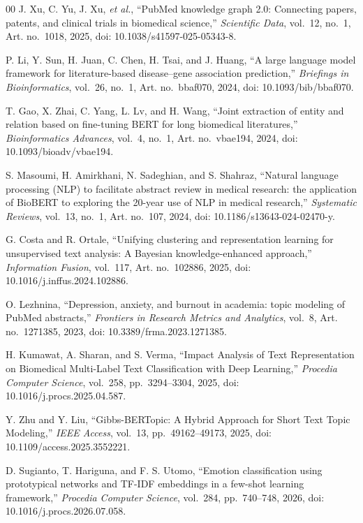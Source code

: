 \documentclass[a4paper,fleqn]{cas-dc}
\begin{document}
\begin{thebibliography}{00}
 J. Xu, C. Yu, J. Xu, \textit{et al.}, ``PubMed knowledge graph 2.0: Connecting papers, patents, and clinical trials in biomedical science,'' \textit{Scientific Data}, vol.~12, no.~1, Art. no.~1018, 2025, doi: 10.1038/s41597-025-05343-8.

 P. Li, Y. Sun, H. Juan, C. Chen, H. Tsai, and J. Huang, ``A large language model framework for literature-based disease–gene association prediction,'' \textit{Briefings in Bioinformatics}, vol.~26, no.~1, Art. no.~bbaf070, 2024, doi: 10.1093/bib/bbaf070.

 T. Gao, X. Zhai, C. Yang, L. Lv, and H. Wang, ``Joint extraction of entity and relation based on fine-tuning BERT for long biomedical literatures,'' \textit{Bioinformatics Advances}, vol.~4, no.~1, Art. no.~vbae194, 2024, doi: 10.1093/bioadv/vbae194.

 S. Masoumi, H. Amirkhani, N. Sadeghian, and S. Shahraz, ``Natural language processing (NLP) to facilitate abstract review in medical research: the application of BioBERT to exploring the 20-year use of NLP in medical research,'' \textit{Systematic Reviews}, vol.~13, no.~1, Art. no.~107, 2024, doi: 10.1186/s13643-024-02470-y.

 G. Costa and R. Ortale, ``Unifying clustering and representation learning for unsupervised text analysis: A Bayesian knowledge-enhanced approach,'' \textit{Information Fusion}, vol.~117, Art. no.~102886, 2025, doi: 10.1016/j.inffus.2024.102886.

 O. Lezhnina, ``Depression, anxiety, and burnout in academia: topic modeling of PubMed abstracts,'' \textit{Frontiers in Research Metrics and Analytics}, vol.~8, Art. no.~1271385, 2023, doi: 10.3389/frma.2023.1271385.

 H. Kumawat, A. Sharan, and S. Verma, ``Impact Analysis of Text Representation on Biomedical Multi-Label Text Classification with Deep Learning,'' \textit{Procedia Computer Science}, vol.~258, pp.~3294--3304, 2025, doi: 10.1016/j.procs.2025.04.587.

 Y. Zhu and Y. Liu, ``Gibbs-BERTopic: A Hybrid Approach for Short Text Topic Modeling,'' \textit{IEEE Access}, vol.~13, pp.~49162--49173, 2025, doi: 10.1109/access.2025.3552221.

 D. Sugianto, T. Hariguna, and F. S. Utomo, ``Emotion classification using prototypical networks and TF-IDF embeddings in a few-shot learning framework,'' \textit{Procedia Computer Science}, vol.~284, pp.~740--748, 2026, doi: 10.1016/j.procs.2026.07.058.


\end{thebibliography}
\end{document}
